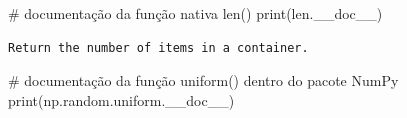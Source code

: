\documentclass[
  brazilian,
  letterpaper,
  DIV=11,
  numbers=noendperiod]{scrreprt}
\newenvironment{Shaded}{\begin{snugshade}}{\end{snugshade}}
\newcommand{\BuiltInTok}[1]{\textcolor[rgb]{0.00,0.23,0.31}{#1}}
\newcommand{\CommentTok}[1]{\textcolor[rgb]{0.37,0.37,0.37}{#1}}
\newcommand{\NormalTok}[1]{\textcolor[rgb]{0.00,0.23,0.31}{#1}}
\begin{document}
\begin{Shaded}
\begin{Highlighting}[]
\CommentTok{\# documentação da função nativa len()}
\BuiltInTok{print}\NormalTok{(}\BuiltInTok{len}\NormalTok{.\_\_doc\_\_)}
\end{Highlighting}
\end{Shaded}

\begin{verbatim}
Return the number of items in a container.
\end{verbatim}

\begin{Shaded}
\begin{Highlighting}[]
\CommentTok{\# documentação da função uniform() dentro do pacote NumPy}
\BuiltInTok{print}\NormalTok{(np.random.uniform.\_\_doc\_\_)}
\end{Highlighting}
\end{Shaded}
\end{document}
